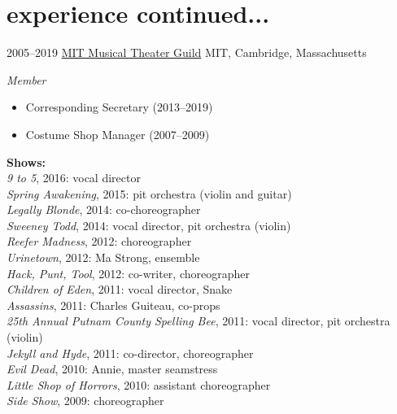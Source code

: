 \documentclass[]{friggeri-cv}
\begin{document}
\newpage
\section{experience continued...}
\begin{entrylist}
  \entry
	{2005--2019}
	{\href{http://web.mit.edu/mtg/www/}{MIT Musical Theater Guild}}
	{MIT, Cambridge, Massachusetts}
	{\emph{Member}
	\begin{itemize}
		\item Corresponding Secretary (2013--2019)
		\item Costume Shop Manager (2007--2009)
	\end{itemize}
	\textbf{Shows:}\\
	\emph{9 to 5}, 2016: vocal director\\
	\emph{Spring Awakening}, 2015: pit orchestra (violin and guitar)\\
	\emph{Legally Blonde}, 2014: co-choreographer\\
	\emph{Sweeney Todd}, 2014: vocal director, pit orchestra (violin)\\
	\emph{Reefer Madness}, 2012: choreographer\\
	\emph{Urinetown}, 2012: Ma Strong, ensemble\\
	\emph{Hack, Punt, Tool}, 2012: co-writer, choreographer\\
	\emph{Children of Eden}, 2011: vocal director, Snake\\
	\emph{Assassins}, 2011: Charles Guiteau, co-props\\
	\emph{25th Annual Putnam County Spelling Bee}, 2011: vocal director, pit orchestra (violin)\\
	\emph{Jekyll and Hyde}, 2011: co-director, choreographer\\
	\emph{Evil Dead}, 2010: Annie, master seamstress\\
	\emph{Little Shop of Horrors}, 2010: assistant choreographer\\
	\emph{Side Show}, 2009: choreographer\\
}
\end{entrylist}
\end{document}
